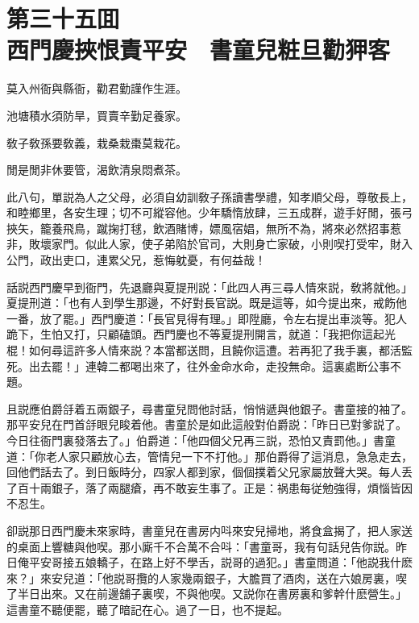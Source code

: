 
\chapter*{第三十五囬　\\西門慶挾恨責平安　書童兒粧旦勸狎客}


\begin{myquote}
莫入州衙與縣衙，勸君勤謹作生涯。

池塘積水須防旱，買賣辛勤足養家。

敎子敎孫要敎義，栽桑栽棗莫栽花。

閒是閒非休要管，渴飲清泉悶煮茶。
\end{myquote}

此八句，單説為人之父母，必須自幼訓敎子孫讀書學禮，知孝順父母，尊敬長上，和睦鄉里，各安生理；切不可縱容他。少年驕惰放肆，三五成群，遊手好閒，張弓挾矢，籠養飛鳥，蹴掬打毬，飲酒賭博，嫖風宿娼，無所不為，將來必然招事惹非，敗壞家門。似此人家，使子弟陷於官司，大則身亡家破，小則喫打受牢，財入公門，政出吏口，連累父兄，惹悔躭憂，有何益哉！

話説西門慶早到衙門，先退廳與夏提刑説：「此四人再三尋人情來説，敎將就他。」夏提刑道：「也有人到學生那邊，不好對長官説。既是這等，如今提出來，戒飭他一番，放了罷。」西門慶道：「長官見得有理。」即陞廳，令左右提出車淡等。犯人跪下，生怕又打，只顧磕頭。西門慶也不等夏提刑開言，就道：「我把你這起光棍！如何尋這許多人情來説？本當都送問，且饒你這遭。若再犯了我手裏，都活監死。出去罷！」連韓二都喝出來了，往外金命水命，走投無命。這裏處断公事不題。

且説應伯爵㧱着五兩銀子，尋書童兒問他討話，悄悄遞與他銀子。書童接的袖了。那平安兒在門首㧱眼兒睃着他。書童於是如此這般對伯爵説：「昨日已對爹説了。今日往衙門裏發落去了。」伯爵道：「他四個父兄再三説，恐怕又責罰他。」書童道：「你老人家只顧放心去，管情兒一下不打他。」那伯爵得了這消息，急急走去，回他們話去了。到日飯時分，四家人都到家，個個撲着父兄家屬放聲大哭。每人丢了百十兩銀子，落了兩腿瘡，再不敢妄生事了。正是：祸患每従勉強得，煩惱皆因不忍生。

卻説那日西門慶未來家時，書童兒在書房内呌來安兒掃地，將食盒揭了，把人家送的桌面上響糖與他喫。那小廝千不合萬不合呌：「書童哥，我有句話兒告你説。昨日俺平安哥接五娘轎子，在路上好不學舌，説哥的過犯。」書童問道：「他説我什麽來？」來安兒道：「他説哥攬的人家幾兩銀子，大膽買了酒肉，送在六娘房裏，喫了半日出來。又在前邊舖子裏喫，不與他喫。又説你在書房裏和爹幹什麽營生。」這書童不聽便罷，聽了暗記在心。過了一日，也不提起。

